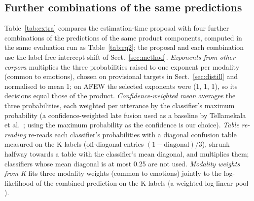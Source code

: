 \documentclass[sn-nature,pdflatex]{sn-jnl}
\begin{document}
\begin{appendices}

\section{Further combinations of the same predictions}\label{app:extra}
Table~\ref{tab:extra} compares the estimation-time proposal with four further combinations of the predictions of the same product components, computed in the same evaluation run as Table~\ref{tab:rq2}; the proposal and each combination use the label-free intercept shift of Sect.~\ref{sec:method}. \emph{Exponents from other corpora} multiplies the three probabilities raised to one exponent per modality (common to emotions), chosen on provisional targets in Sect.~\ref{sec:distill} and normalised to mean 1; on AFEW the selected exponents were (1, 1, 1), so its decisions equal those of the product. \emph{Confidence-weighted mean} averages the three probabilities, each weighted per utterance by the classifier's maximum probability (a confidence-weighted late fusion used as a baseline by Tellamekala et al.\ \cite{tellamekala2024}; using the maximum probability as the confidence is our choice). \emph{Table re-reading} re-reads each classifier's probabilities with a diagonal confusion table measured on the K labels (off-diagonal entries $(1-\text{diagonal})/3$), shrunk halfway towards a table with the classifier's mean diagonal, and multiplies them; classifiers whose mean diagonal is at most 0.25 are not used. \emph{Modality weights from K} fits three modality weights (common to emotions) jointly to the log-likelihood of the combined prediction on the K labels (a weighted log-linear pool \cite{heskes1997}).


\end{appendices}
\end{document}
